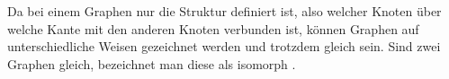Da bei einem Graphen nur die Struktur definiert ist, also welcher Knoten über welche Kante mit den anderen Knoten verbunden ist, können Graphen auf unterschiedliche Weisen gezeichnet werden und trotzdem gleich sein.
Sind zwei Graphen gleich, bezeichnet man diese als isomorph \cite[Seite 22]{basicgraphtheory}.
%
%
